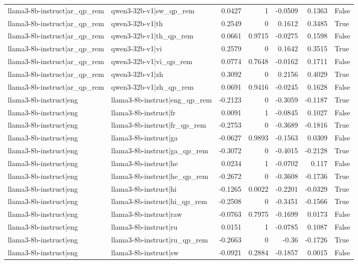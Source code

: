 \begin{table}
\begin{tabular}{l l r r r r l}
llama3-8b-instruct|ar_qp_rem & qwen3-32b-v1|sw_qp_rem & 0.0427 & 1 & -0.0509 & 0.1363 & False \\
llama3-8b-instruct|ar_qp_rem & qwen3-32b-v1|th & 0.2549 & 0 & 0.1612 & 0.3485 & True \\
llama3-8b-instruct|ar_qp_rem & qwen3-32b-v1|th_qp_rem & 0.0661 & 0.9715 & -0.0275 & 0.1598 & False \\
llama3-8b-instruct|ar_qp_rem & qwen3-32b-v1|vi & 0.2579 & 0 & 0.1642 & 0.3515 & True \\
llama3-8b-instruct|ar_qp_rem & qwen3-32b-v1|vi_qp_rem & 0.0774 & 0.7648 & -0.0162 & 0.1711 & False \\
llama3-8b-instruct|ar_qp_rem & qwen3-32b-v1|zh & 0.3092 & 0 & 0.2156 & 0.4029 & True \\
llama3-8b-instruct|ar_qp_rem & qwen3-32b-v1|zh_qp_rem & 0.0691 & 0.9416 & -0.0245 & 0.1628 & False \\
llama3-8b-instruct|eng & llama3-8b-instruct|eng_qp_rem & -0.2123 & 0 & -0.3059 & -0.1187 & True \\
llama3-8b-instruct|eng & llama3-8b-instruct|fr & 0.0091 & 1 & -0.0845 & 0.1027 & False \\
llama3-8b-instruct|eng & llama3-8b-instruct|fr_qp_rem & -0.2753 & 0 & -0.3689 & -0.1816 & True \\
llama3-8b-instruct|eng & llama3-8b-instruct|ga & -0.0627 & 0.9893 & -0.1563 & 0.0309 & False \\
llama3-8b-instruct|eng & llama3-8b-instruct|ga_qp_rem & -0.3072 & 0 & -0.4015 & -0.2128 & True \\
llama3-8b-instruct|eng & llama3-8b-instruct|he & 0.0234 & 1 & -0.0702 & 0.117 & False \\
llama3-8b-instruct|eng & llama3-8b-instruct|he_qp_rem & -0.2672 & 0 & -0.3608 & -0.1736 & True \\
llama3-8b-instruct|eng & llama3-8b-instruct|hi & -0.1265 & 0.0022 & -0.2201 & -0.0329 & True \\
llama3-8b-instruct|eng & llama3-8b-instruct|hi_qp_rem & -0.2508 & 0 & -0.3451 & -0.1566 & True \\
llama3-8b-instruct|eng & llama3-8b-instruct|raw & -0.0763 & 0.7975 & -0.1699 & 0.0173 & False \\
llama3-8b-instruct|eng & llama3-8b-instruct|ru & 0.0151 & 1 & -0.0785 & 0.1087 & False \\
llama3-8b-instruct|eng & llama3-8b-instruct|ru_qp_rem & -0.2663 & 0 & -0.36 & -0.1726 & True \\
llama3-8b-instruct|eng & llama3-8b-instruct|sw & -0.0921 & 0.2884 & -0.1857 & 0.0015 & False \\

\end{tabular}
\end{table}
